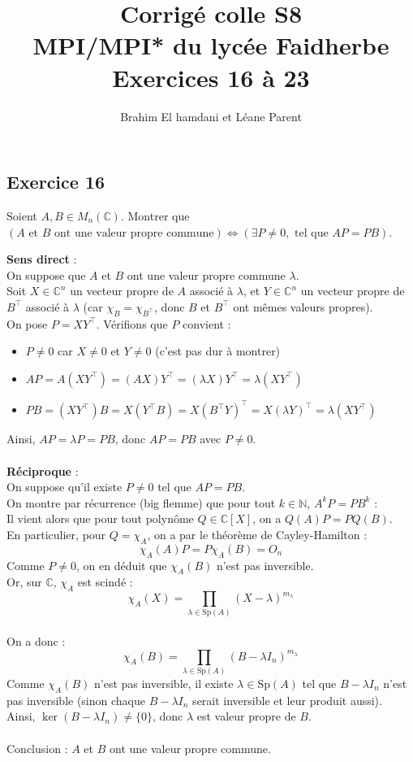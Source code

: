 \documentclass[a4paper,12pt]{article}
\title{Corrigé colle S8 \\
	MPI/MPI* du lycée Faidherbe \\
	\large Exercices 16 à 23}
\author{Brahim El hamdani et Léane Parent}
\begin{document}
	\maketitle
	
	\subsection*{Exercice 16}
    Soient $A, B \in M_n(\mathbb{C})$.
	Montrer que $(A \text{ et } B \text{ ont une valeur propre commune}) \iff (\exists P \neq 0, \text{ tel que } AP = PB)$.
	
	\begin{correctionbox}
		\textbf{Sens direct} : \\
		On suppose que $A$ et $B$ ont une valeur propre commune $\lambda$. \\
		Soit $X \in \mathbb{C}^n$ un vecteur propre de $A$ associé à $\lambda$, et $Y \in \mathbb{C}^n$ un vecteur propre de $B^\top$ associé à $\lambda$ (car  $\chi_B = \chi_{B^\top}$, donc $B$ et $B^\top$ ont mêmes valeurs propres). \\
		On pose $P = X Y^\top$. Vérifions que $P$ convient :
		\begin{itemize}
			\item $P \neq 0$ car $X \neq 0$ et $Y \neq 0$ (c'est pas dur à montrer)
			\item $AP = A(X Y^\top) = (AX) Y^\top = (\lambda X) Y^\top = \lambda (X Y^\top)$
			\item $PB = (X Y^\top) B = X (Y^\top B) = X (B^\top Y)^\top = X (\lambda Y)^\top = \lambda (X Y^\top)$
		\end{itemize}
		Ainsi, $AP = \lambda P = PB$, donc $AP = PB$ avec $P \neq 0$.	
		\\\\
		\textbf{Réciproque} : \\
		On suppose qu'il existe $P \neq 0$ tel que $AP = PB$. \\ On montre par récurrence (big flemme) que pour tout $k \in \mathbb{N}$, $A^k P = P B^k$ :\\ Il vient alors que pour tout polynôme $Q \in \mathbb{C}[X]$, on a $Q(A)P = P Q(B)$.\\En particulier, pour $Q = \chi_A$, on a par le théorème de Cayley-Hamilton :
		$$\chi_A(A) P = P \chi_A(B) = O_n$$
		Comme $P \neq 0$, on en déduit que $\chi_A(B)$ n'est pas inversible. \\
		
		Or, sur $\mathbb{C}$, $\chi_A$ est scindé :
		$$\chi_A(X) = \prod_{\lambda \in \mathrm{Sp}(A)} (X - \lambda)^{m_\lambda}$$\\
		
		On a donc :
		$$\chi_A(B) = \prod_{\lambda \in \mathrm{Sp}(A)} (B - \lambda I_n)^{m_\lambda}$$
		Comme $\chi_A(B)$ n'est pas inversible, il existe $\lambda \in \mathrm{Sp}(A)$ tel que $B - \lambda I_n$ n'est pas inversible (sinon chaque $B - \lambda I_n$ serait inversible et leur produit aussi). \\ Ainsi, $\ker(B - \lambda I_n) \neq \{0\}$, donc $\lambda$ est valeur propre de $B$. \\\\Conclusion : $A$ et $B$ ont une valeur propre commune.
	\end{correctionbox}
\end{document}
